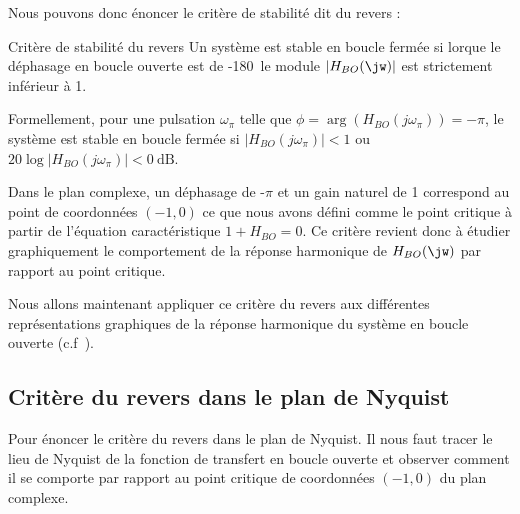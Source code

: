 Nous pouvons donc énoncer le critère de stabilité dit du revers :
\begin{criteria}{Critère de stabilité du revers}
    Un système est stable en boucle fermée si lorque le 
    déphasage en boucle ouverte est de -180\degree~le module $|H_{BO}(\jw)|$ 
    est strictement inférieur à 1.
\end{criteria}
Formellement, pour une pulsation $\omega_{\pi}$ telle que 
$\phi=\arg{\left(H_{BO}(j\omega_\pi)\right)}=-\pi$, 
le système est stable en boucle fermée si $|H_{BO}(j\omega_\pi)|<1$ ou 
$20\log{|H_{BO}(j\omega_\pi)|}<\SI{0}{\dB}$.

Dans le plan complexe, un  déphasage de -$\pi$ et un gain naturel de 1 
correspond au point de coordonnées $(-1,0)$ ce que nous avons défini comme 
le point critique à partir de l'équation caractéristique $1+H_{BO}=0$. 
Ce critère revient donc à étudier graphiquement le comportement 
de la réponse harmonique de $H_{BO}(\jw)$ par rapport au point critique.

Nous allons maintenant appliquer ce 
critère du revers aux différentes représentations graphiques de la 
réponse harmonique du système en boucle ouverte (c.f~).
\clearpage
\subsection{Critère du revers dans le plan de Nyquist
}
Pour énoncer le critère du revers dans le plan de Nyquist. Il nous faut tracer
le lieu de Nyquist de la fonction de transfert en boucle ouverte et observer 
comment il se comporte par rapport au point critique de coordonnées $(-1,0)$ 
du plan complexe. 

